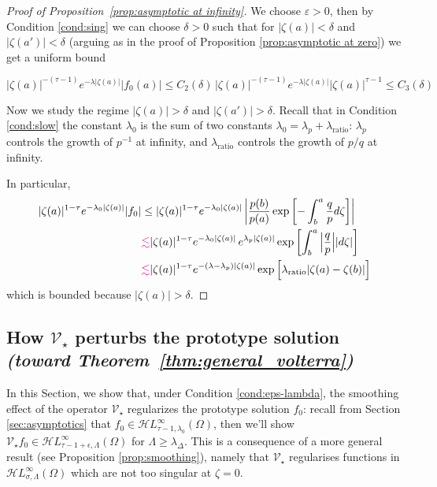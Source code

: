 \documentclass{article}
\theoremstyle{plain}
\newcommand{\singexp}[2]{\mathcal{H}L^\infty_{#1, #2}}
\newcommand{\softpart}{\mathcal{V}_\star}
\begin{document}
\begin{proof}[Proof of Proposition~\ref{prop:asymptotic at infinity}]
We choose $\varepsilon>0$, then by Condition \eqref{cond:sing} we can choose $\delta>0$ such that for $|\zeta(a)|<\delta$ and $|\zeta(a')|<\delta$ (arguing as in the proof of Proposition \ref{prop:asymptotic at zero}) we get a uniform bound 

\[   |\zeta(a)|^{-(\tau-1)} e^{-\lambda |\zeta(a)|} |f_0(a)|\leq  C_2(\delta)\, |\zeta(a)|^{-(\tau-1)} e^{-\lambda |\zeta(a)|} |\zeta(a)|^{\tau-1} \leq C_3(\delta)
\]

Now we study the regime $|\zeta(a)|>\delta$ and $|\zeta(a')|>\delta$. Recall that in Condition \eqref{cond:slow} the constant $\lambda_0$ is the sum of two constants $\lambda_0=\lambda_p+\lambda_\text{ratio}$: $\lambda_p$ controls the growth of $p^{-1}$ at infinity, and $\lambda_\text{ratio}$ controls the growth of $p/q$ at infinity. 

In particular, 
      \begin{align*}
          |\zeta(a)|^{1-\tau} e^{-\lambda_0 |\zeta(a)|} |f_0|&\leq  |\zeta(a)|^{1-\tau} e^{-\lambda_0 |\zeta(a)|} \left\vert\frac{p(b)}{p(a)}\exp\left[-\int_{b}^{a}\frac{q}{p} d\zeta\right]\right\vert \\
          & \textcolor{magenta}{\lesssim}  |\zeta(a)|^{1-\tau} e^{-\lambda_0 |\zeta(a)|}  \, e^{\lambda_p|\zeta(a)|}\exp\left[\int_{b}^{a} \Big\vert\frac{q}{p} \Big\vert |d\zeta| \right]\\
          & \textcolor{magenta}{\lesssim}  |\zeta(a)|^{1-\tau} e^{-(\lambda-\lambda_p) |\zeta(a)|} \exp\Big[\lambda_\text{ratio} |\zeta(a)-\zeta(b)| \Big]
      \end{align*}
   which is bounded because $|\zeta(a)|>\delta$. 


\end{proof}

\subsection{How $\softpart$ perturbs the prototype solution \\ \textit{(toward Theorem~\ref{thm:general_volterra})}}\label{sec:image under soft_part}

In this Section, we show that, under Condition \eqref{cond:eps-lambda}, the smoothing effect of the operator $\softpart$ regularizes the prototype solution $f_0$: recall from Section \ref{sec:asymptotics} that $f_0\in\singexp{\tau-1}{\lambda_0}(\Omega)$, then we'll show $\softpart f_0 \in\singexp{\tau-1+\epsilon}{\Lambda}(\Omega)$ for $\Lambda\geq \lambda_\Delta$. This is a consequence of a more general result (see Proposition \ref{prop:smoothing}), namely that $\softpart$ regularises functions in $\singexp{\sigma}{\Lambda}(\Omega)$ which are not too singular at $\zeta=0$.  
\end{document}

